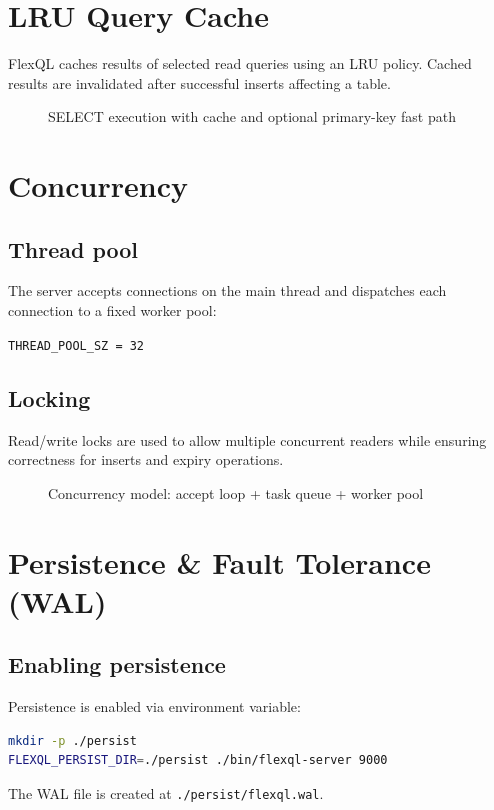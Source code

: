 \documentclass[11pt,a4paper]{article}
\begin{document}
\section{LRU Query Cache}
FlexQL caches results of selected read queries using an LRU policy. Cached results are invalidated after successful inserts affecting a table.

\begin{figure}[H]
\centering

\caption{SELECT execution with cache and optional primary-key fast path}
\end{figure}

\section{Concurrency}
\subsection{Thread pool}
The server accepts connections on the main thread and dispatches each connection to a fixed worker pool:
\begin{center}
\texttt{THREAD\_POOL\_SZ = 32}
\end{center}

\subsection{Locking}
Read/write locks are used to allow multiple concurrent readers while ensuring correctness for inserts and expiry operations.

\begin{figure}[H]
\centering

\caption{Concurrency model: accept loop + task queue + worker pool}
\end{figure}

\section{Persistence \& Fault Tolerance (WAL)}
\subsection{Enabling persistence}
Persistence is enabled via environment variable:\\
\begin{lstlisting}[language=bash]
mkdir -p ./persist
FLEXQL_PERSIST_DIR=./persist ./bin/flexql-server 9000
\end{lstlisting}
The WAL file is created at \texttt{./persist/flexql.wal}.
\end{document}
